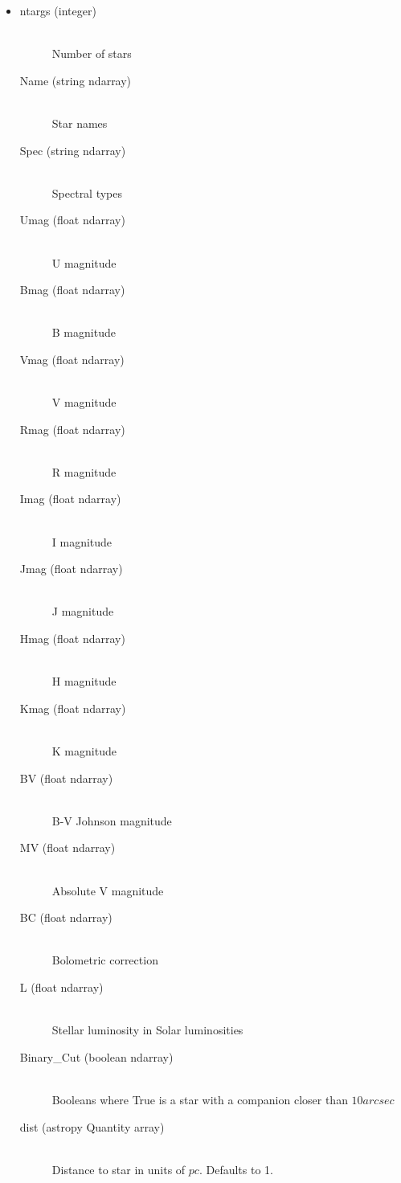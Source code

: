 \documentclass[cleanfoot]{asme2ej}
\begin{document}
\begin{itemize}
\item 
\begin{description}
    \item[ntargs (integer)] \hfill \\ Number of stars
    \item[Name (string ndarray)] \hfill \\ Star names
    \item[Spec (string ndarray)] \hfill \\ Spectral types
    \item[Umag (float ndarray)] \hfill \\ U magnitude
    \item[Bmag (float ndarray)] \hfill \\ B magnitude
    \item[Vmag (float ndarray)] \hfill \\ V magnitude
    \item[Rmag (float ndarray)] \hfill \\ R magnitude
    \item[Imag (float ndarray)] \hfill \\ I magnitude
    \item[Jmag (float ndarray)] \hfill \\ J magnitude
    \item[Hmag (float ndarray)] \hfill \\ H magnitude
    \item[Kmag (float ndarray)] \hfill \\ K magnitude
    \item[BV (float ndarray)] \hfill \\ B-V Johnson magnitude
    \item[MV (float ndarray)] \hfill \\ Absolute V magnitude
    \item[BC (float ndarray)] \hfill \\ Bolometric correction
    \item[L (float ndarray)] \hfill \\ Stellar luminosity in Solar luminosities
    \item[Binary\_Cut (boolean ndarray)] \hfill \\ Booleans where True is a star with a companion closer than $ 10 arcsec $
    \item[dist (astropy Quantity array)] \hfill \\ Distance to star in units of $ pc $. Defaults to 1.

\end{description}
\end{itemize}
\end{document}
